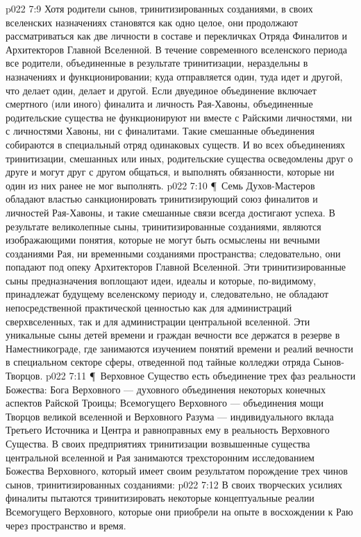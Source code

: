 \vs p022 7:9 Хотя родители сынов, тринитизированных созданиями, в своих вселенских назначениях становятся как одно целое, они продолжают рассматриваться как две личности в составе и перекличках Отряда Финалитов и Архитекторов Главной Вселенной. В течение современного вселенского периода все родители, объединенные в результате тринитизации, нераздельны в назначениях и функционировании; куда отправляется один, туда идет и другой, что делает один, делает и другой. Если двуединое объединение включает смертного (или иного) финалита и личность Рая\hyp{}Хавоны, объединенные родительские существа не функционируют ни вместе с Райскими личностями, ни с личностями Хавоны, ни с финалитами. Такие смешанные объединения собираются в специальный отряд одинаковых существ. И во всех объединениях тринитизации, смешанных или иных, родительские существа осведомлены друг о друге и могут друг с другом общаться, и выполнять обязанности, которые ни один из них ранее не мог выполнять.
\vs p022 7:10 \P\ Семь Духов\hyp{}Мастеров обладают властью санкционировать тринитизирующий союз финалитов и личностей Рая\hyp{}Хавоны, и такие смешанные связи всегда достигают успеха. В результате великолепные сыны, тринитизированные созданиями, являются изображающими понятия, которые не могут быть осмыслены ни вечными созданиями Рая, ни временными созданиями пространства; следовательно, они попадают под опеку Архитекторов Главной Вселенной. Эти тринитизированные сыны предназначения воплощают идеи, идеалы и  которые, по\hyp{}видимому, принадлежат будущему вселенскому периоду и, следовательно, не обладают непосредственной практической ценностью как для администраций сверхвселенных, так и для администрации центральной вселенной. Эти уникальные сыны детей времени и граждан вечности все держатся в резерве в Наместникограде, где занимаются изучением понятий времени и реалий вечности в специальном секторе сферы, отведенной под тайные колледжи отряда Сынов\hyp{}Творцов.
\vs p022 7:11 \P\ Верховное Существо есть объединение трех фаз реальности Божества: Бога Верховного --- духовного объединения некоторых конечных аспектов Райской Троицы; Всемогущего Верховного --- объединения мощи Творцов великой вселенной и Верховного Разума --- индивидуального вклада Третьего Источника и Центра и равноправных ему в реальность Верховного Существа. В своих предприятиях тринитизации возвышенные существа центральной вселенной и Рая занимаются трехсторонним исследованием Божества Верховного, который имеет своим результатом порождение трех чинов сынов, тринитизированных созданиями:
\vs p022 7:12 \bibnobreakspace {} В своих творческих усилиях финалиты пытаются тринитизировать некоторые концептуальные реалии Всемогущего Верховного, которые они приобрели на опыте в восхождении к Раю через пространство и время.
